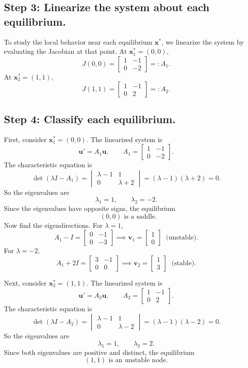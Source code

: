 \documentclass[10pt,letterpaper]{article}
\begin{document}
\subsection*{Step 3: Linearize the system about each equilibrium.}
To study the local behavior near each equilibrium \(\mathbf{x}^*\), we linearize the system by evaluating the Jacobian at that point.
At \(\mathbf{x}_1^*=(0,0)\),
\[
J(0,0)=
\begin{bmatrix}
1 & -1\\[2pt]
0 & -2
\end{bmatrix}
=:A_1.
\]
At \(\mathbf{x}_2^*=(1,1)\),
\[
J(1,1)=
\begin{bmatrix}
1 & -1\\[2pt]
0 & 2
\end{bmatrix}
=:A_2.
\]
\subsection*{Step 4: Classify each equilibrium.}
First, consider \(\mathbf{x}_1^*=(0,0)\). The linearized system is
\[
\mathbf{u}'=A_1\mathbf{u},
\qquad
A_1=
\begin{bmatrix}
1 & -1\\
0 & -2
\end{bmatrix}.
\]
The characteristic equation is
\[
\det(\lambda I-A_1)
=
\begin{vmatrix}
\lambda-1 & 1\\[2pt]
0 & \lambda+2
\end{vmatrix}
=
(\lambda-1)(\lambda+2)=0.
\]
So the eigenvalues are
\[
\lambda_1=1,
\qquad
\lambda_2=-2.
\]
Since the eigenvalues have opposite signs, the equilibrium 
\[
\boxed{\text{ \((0,0)\) is a saddle}.}
\]
Now find the eigendirections. For \(\lambda=1\),
\[
A_1-I=
\begin{bmatrix}
0 & -1\\
0 & -3
\end{bmatrix} \implies \mathbf{v}_1=
\begin{bmatrix}
1\\0
\end{bmatrix}\; \text{ (unstable)}.
\]
For \(\lambda=-2\),
\[
A_1+2I=
\begin{bmatrix}
3 & -1\\
0 & 0
\end{bmatrix} \implies \mathbf{v}_2=
\begin{bmatrix}
1\\3
\end{bmatrix}\; \text{ (stable)}.
\]

Next, consider \(\mathbf{x}_2^*=(1,1)\). The linearized system is
\[
\mathbf{u}'=A_2\mathbf{u},
\qquad
A_2=
\begin{bmatrix}
1 & -1\\
0 & 2
\end{bmatrix}.
\]
The characteristic equation is
\[
\det(\lambda I-A_2)
=
\begin{vmatrix}
\lambda-1 & 1\\[2pt]
0 & \lambda-2
\end{vmatrix}
=
(\lambda-1)(\lambda-2)=0.
\]
So the eigenvalues are
\[
\lambda_1=1,
\qquad
\lambda_2=2.
\]
Since both eigenvalues are positive and distinct, the equilibrium 
\[
\boxed{\text{\((1,1)\) is an unstable node}.}
\]
\end{document}
